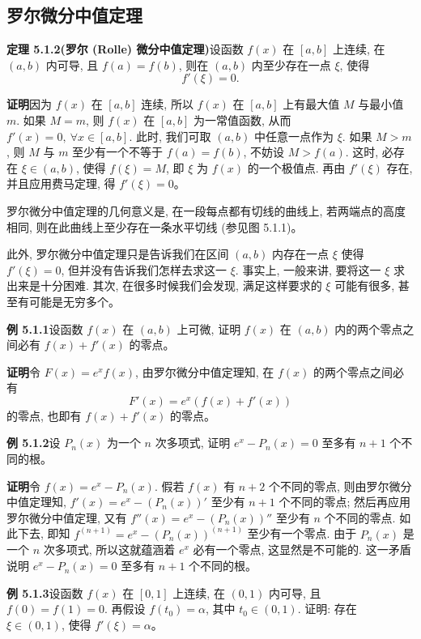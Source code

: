 \documentclass[UTF8,12pt,a4paper,fontset=fandol]{ctexart}
\begin{document}
\subsection{罗尔微分中值定理}

\noindent\textbf{定理 5.1.2(罗尔 (Rolle) 微分中值定理)}\quad 设函数 $f(x)$ 在 $[a,b]$ 上连续, 在 $(a,b)$ 内可导, 且 $f(a)=f(b)$, 则在 $(a,b)$ 内至少存在一点 $\xi$, 使得
\[
  f'(\xi)=0.
\]

\noindent\textbf{证明}\quad 因为 $f(x)$ 在 $[a,b]$ 连续, 所以 $f(x)$ 在 $[a,b]$ 上有最大值 $M$ 与最小值 $m$. 如果 $M=m$, 则 $f(x)$ 在 $[a,b]$ 为一常值函数, 从而 $f'(x)=0,\ \forall x\in[a,b]$. 此时, 我们可取 $(a,b)$ 中任意一点作为 $\xi$. 如果 $M>m$, 则 $M$ 与 $m$ 至少有一个不等于 $f(a)=f(b)$, 不妨设 $M>f(a)$. 这时, 必存在 $\xi\in(a,b)$, 使得 $f(\xi)=M$, 即 $\xi$ 为 $f(x)$ 的一个极值点. 再由 $f'(\xi)$ 存在, 并且应用费马定理, 得 $f'(\xi)=0$。

罗尔微分中值定理的几何意义是, 在一段每点都有切线的曲线上, 若两端点的高度相同, 则在此曲线上至少存在一条水平切线 (参见图 5.1.1)。

此外, 罗尔微分中值定理只是告诉我们在区间 $(a,b)$ 内存在一点 $\xi$ 使得 $f'(\xi)=0$, 但并没有告诉我们怎样去求这一 $\xi$. 事实上, 一般来讲, 要将这一 $\xi$ 求出来是十分困难. 其次, 在很多时候我们会发现, 满足这样要求的 $\xi$ 可能有很多, 甚至有可能是无穷多个。

\noindent\textbf{例 5.1.1}\quad 设函数 $f(x)$ 在 $(a,b)$ 上可微, 证明 $f(x)$ 在 $(a,b)$ 内的两个零点之间必有 $f(x)+f'(x)$ 的零点。

\noindent\textbf{证明}\quad 令 $F(x)=e^x f(x)$, 由罗尔微分中值定理知, 在 $f(x)$ 的两个零点之间必有
\[
  F'(x)=e^x(f(x)+f'(x))
\]
的零点, 也即有 $f(x)+f'(x)$ 的零点。

\noindent\textbf{例 5.1.2}\quad 设 $P_n(x)$ 为一个 $n$ 次多项式, 证明 $e^x-P_n(x)=0$ 至多有 $n+1$ 个不同的根。

\noindent\textbf{证明}\quad 令 $f(x)=e^x-P_n(x)$. 假若 $f(x)$ 有 $n+2$ 个不同的零点, 则由罗尔微分中值定理知, $f'(x)=e^x-(P_n(x))'$ 至少有 $n+1$ 个不同的零点; 然后再应用罗尔微分中值定理, 又有 $f''(x)=e^x-(P_n(x))''$ 至少有 $n$ 个不同的零点. 如此下去, 即知 $f^{(n+1)}=e^x-(P_n(x))^{(n+1)}$ 至少有一个零点. 由于 $P_n(x)$ 是一个 $n$ 次多项式, 所以这就蕴涵着 $e^x$ 必有一个零点, 这显然是不可能的. 这一矛盾说明 $e^x-P_n(x)=0$ 至多有 $n+1$ 个不同的根。

\noindent\textbf{例 5.1.3}\quad 设函数 $f(x)$ 在 $[0,1]$ 上连续, 在 $(0,1)$ 内可导, 且 $f(0)=f(1)=0$. 再假设 $f(t_0)=\alpha$, 其中 $t_0\in(0,1)$. 证明: 存在 $\xi\in(0,1)$, 使得 $f'(\xi)=\alpha$。
\end{document}
